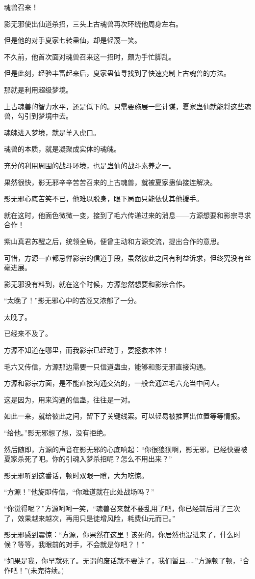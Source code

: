 \begin{this_body}
魂兽召来！

影无邪使出仙道杀招，三头上古魂兽再次环绕他周身左右。

但是他的对手夏家七转蛊仙，却是轻蔑一笑。

不久前，他首次面对魂兽召来这一招时，颇为手忙脚乱。

但是此刻，经验丰富起来后，夏家蛊仙寻找到了快速克制上古魂兽的方法。

那就是利用超级梦境。

上古魂兽的智力水平，还是低下的。只需要施展一些计谋，夏家蛊仙就能将这些魂兽，勾引到梦境中去。

魂魄进入梦境，就是羊入虎口。

魂兽的本质，就是凝聚成实体的魂魄。

充分的利用周围的战斗环境，也是蛊仙的战斗素养之一。

果然很快，影无邪辛辛苦苦召来的上古魂兽，就被夏家蛊仙接连解决。

影无邪心底苦笑不已，他难以脱身，眼下局面只能依仗其他援手。

就在这时，他面色微微一变，接到了毛六传递过来的消息——方源想要和影宗寻求合作！

紫山真君苏醒之后，统领全局，便曾主动和方源交流，提出合作的意思。

可惜，方源一直都忌惮影宗的信道手段，虽然彼此之间有利益诉求，但终究没有丝毫进展。

影无邪没有料到，就在这个时候，方源忽然想要和影宗合作。

“太晚了！”影无邪心中的苦涩又浓郁了一分。

太晚了。

已经来不及了。

方源不知道在哪里，而我影宗已经动手，要拯救本体！

毛六又传信，方源那边需要一只信道蛊虫，能够和影无邪直接沟通。

方源和影宗方面，是不能直接沟通交流的，一般会通过毛六充当中间人。

这是因为，用来沟通的信蛊，往往是一对。

如此一来，就给彼此之间，留下了关键线索。可以轻易被推算出位置等等情报。

“给他。”影无邪想了想，没有拒绝。

然后随即，方源的声音在影无邪的心底响起：“你很狼狈啊，影无邪，已经快要被夏家杀死了吧。你的引魂入梦杀招呢？怎么不用出来？”

影无邪听到这番话，顿时双眼一瞪，大为吃惊。

“方源！”他旋即传信，“你难道就在此处战场吗？”

“你觉得呢？”方源呵呵一笑，“魂兽召来就不要乱用了吧，你已经前后用了三次了，效果越来越次，再用只是徒增风险，耗费仙元而已。”

影无邪感到震惊：“方源，你果然在这里！该死的，你居然也混进来了，什么时候？等等，我眼前的对手，不会就是你吧？！”

“如果是我，你早就死了。无谓的废话就不要讲了，我们暂且……”方源顿了顿，“合作吧！”(未完待续。)

\end{this_body}

